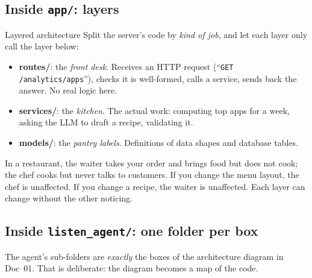 \documentclass[11pt,a4paper]{article}
\begin{document}
\subsection{Inside \texttt{app/}: layers}
\begin{concept}{Layered architecture}
Split the server's code by \emph{kind of job}, and let each layer only call the layer below:
\begin{itemize}[nosep]
  \item \textbf{routes/}: the \emph{front desk}. Receives an HTTP request
        (``\texttt{GET /analytics/apps}''), checks it is well-formed, calls a service, sends
        back the answer. No real logic here.
  \item \textbf{services/}: the \emph{kitchen}. The actual work: computing top apps for a
        week, asking the LLM to draft a recipe, validating it.
  \item \textbf{models/}: the \emph{pantry labels}. Definitions of data shapes and database
        tables.
\end{itemize}
\end{concept}

\begin{analogy}
In a restaurant, the waiter takes your order and brings food but does not cook; the chef cooks
but never talks to customers. If you change the menu layout, the chef is unaffected. If you
change a recipe, the waiter is unaffected. Each layer can change without the other noticing.
\end{analogy}

\begin{center}
\end{center}

\subsection{Inside \texttt{listen\_agent/}: one folder per box}
The agent's sub-folders are \emph{exactly} the boxes of the architecture diagram in Doc~01.
That is deliberate: the diagram becomes a map of the code.
\end{document}
